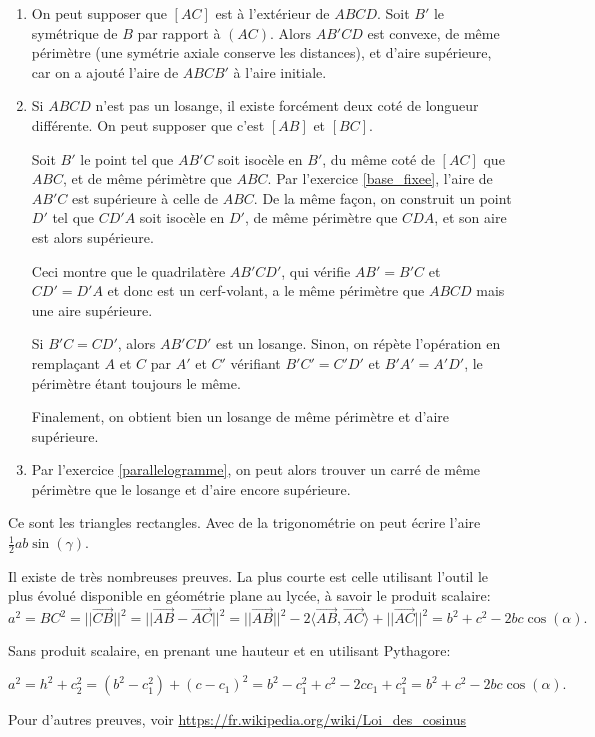 \begin{Soln}{71}
\begin{enumerate}
\item On peut supposer que $[AC]$ est à l'extérieur de $ABCD$. Soit $B'$ le symétrique de $B$ par rapport à $(AC)$. Alors $AB'CD$ est convexe, de même périmètre (une symétrie axiale conserve les distances), et d'aire supérieure, car on a ajouté l'aire de $ABCB'$ à l'aire initiale.
\item Si $ABCD$ n'est pas un losange, il existe forcément deux coté de longueur différente. On peut supposer que c'est $[AB]$ et $[BC]$.

Soit $B'$ le point tel que $AB'C$ soit isocèle en $B'$, du même coté de $[AC]$ que $ABC$, et de même périmètre que $ABC$. Par l'exercice \ref{base_fixee}, l'aire de $AB'C$ est supérieure à celle de $ABC$. De la même façon, on construit un point $D'$ tel que $CD'A$ soit isocèle en $D'$, de même périmètre que $CDA$, et son aire est alors supérieure.

Ceci montre que le quadrilatère $AB'CD'$, qui vérifie $AB'=B'C$ et $CD'=D'A$ et donc est un cerf-volant, a le même périmètre que $ABCD$ mais une aire supérieure.

Si $B'C=CD'$, alors $AB'CD'$ est un losange. Sinon, on répète l'opération en remplaçant $A$ et $C$ par $A'$ et $C'$ vérifiant $B'C'=C'D'$ et $B'A'=A'D'$, le périmètre étant toujours le même.

Finalement, on obtient bien un losange de même périmètre et d'aire supérieure.

\item Par l'exercice \ref{parallelogramme}, on peut alors trouver un carré de même périmètre que le losange et d'aire encore supérieure.
\end{enumerate}
\end{Soln}
\begin{Soln}{72}
Ce sont les triangles rectangles. Avec de la trigonométrie on peut écrire l'aire $\frac12 ab\sin(\gamma)$.
\end{Soln}
\begin{Soln}{73}
Il existe de très nombreuses preuves. La plus courte est celle utilisant l'outil le plus évolué disponible en géométrie plane au lycée, à savoir le produit scalaire:
\[ a^2 = BC^2=||\overrightarrow{CB}||^2 = ||\overrightarrow{AB} - \overrightarrow{AC}  ||^2 =||\overrightarrow{AB}||^2-2\langle \overrightarrow{AB},\overrightarrow{AC}\rangle+||\overrightarrow{AC}||^2= b^2+c^2 - 2bc \cos(\alpha).\]

Sans produit scalaire, en prenant une hauteur et en utilisant Pythagore:

\[  a^2 = h^2+c_2^2 = (b^2-c_1^2) + (c-c_1)^2 = b^2-c_1^2+c^2-2cc_1 +c_1^2=b^2+c^2 - 2bc\cos(\alpha).\]

Pour d'autres preuves, voir \url{https://fr.wikipedia.org/wiki/Loi_des_cosinus}
\end{Soln}
